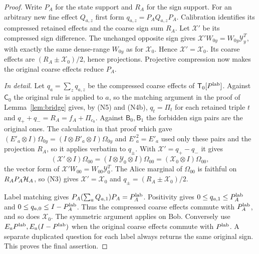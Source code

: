 \begin{proof}
Write $P_A$ for the state support and $R_A$ for the sign support. For an arbitrary new fine effect $Q_{a,z}$ first form $q_{a,z}=P_AQ_{a,z}P_A$. Calibration identifies its compressed retained effects and the coarse sign sum $R_A$. Let $\mathcal X'$ be its compressed sign difference. The unchanged opposite sign gives $\mathcal X'W_{0y}=W_{0y}\mathcal Y_y^T$, with exactly the same dense-range $W_{0y}$ as for $\mathcal X_0$. Hence $\mathcal X'=\mathcal X_0$. Its coarse effects are $(R_A\pm \mathcal X_0)/2$, hence projections. Projective compression now makes the original coarse effects reduce $P_A$.

\emph{In detail.} Let $q_a=\sum_zq_{a,z}$ be the compressed coarse effects of $\mathsf T_0[P^{\rm lab}]$. Against $\mathsf C_0$ the original rule is applied to $a$, so the matching argument in the proof of Lemma~\ref{lem:bridge} gives, by (N5) and (N4b), $q_t=\Pi_t$ for each retained triple $t$ and $q_++q_-=R_A=f_A+\Pi_{c_0}$. Against $\mathsf B_0,\mathsf B_1$ the forbidden sign pairs are the original ones. The calculation in that proof which gave $(E'_a\otimes I)\Omega_{0y}=(I\otimes B'_a\otimes I)\Omega_{0y}$ and $E'^2_a=E'_a$ used only these pairs and the projection $R_A$, so it applies verbatim to $q_\pm$. With $\mathcal X'=q_+-q_-$ it gives
\[
 (\mathcal X'\otimes I)\Omega_{00}=(I\otimes\mathcal Y_0\otimes I)\Omega_{00}=(\mathcal X_0\otimes I)\Omega_{00},
\]
the vector form of $\mathcal X'W_{00}=W_{00}\mathcal Y_0^T$. The Alice marginal of $\Omega_{00}$ is faithful on $R_AP_A\mathcal H_A$, so (N3) gives $\mathcal X'=\mathcal X_0$ and $q_\pm=(R_A\pm\mathcal X_0)/2$.

Label matching gives $P_A(\sum_aQ_{a,1})P_A=P^{\rm lab}_{A}$. Positivity gives $0\leq q_{a,1}\leq P^{\rm lab}_{A}$ and $0\leq q_{a,0}\leq I-P^{\rm lab}_{A}$. Thus the compressed coarse effects commute with $P^{\rm lab}_{A}$, and so does $\mathcal X_0$. The symmetric argument applies on Bob. Conversely use $E_aP^{\rm lab},E_a(I-P^{\rm lab})$ when the original coarse effects commute with $P^{\rm lab}$. A separate duplicated question for each label always returns the same original sign. This proves the final assertion.


\end{proof}
